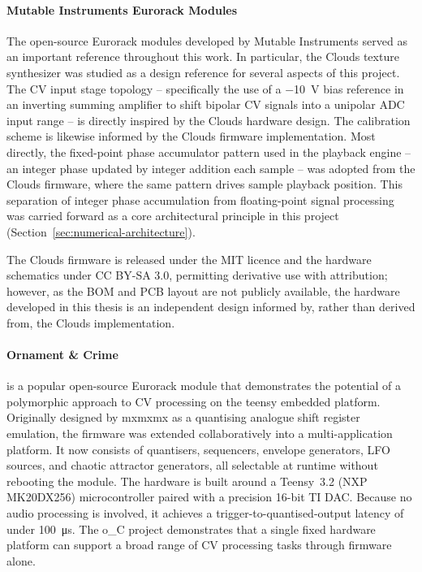 \paragraph{Mutable Instruments Eurorack Modules \cite{pichenettesPichenettesEurorack2026}}
The open-source Eurorack modules developed by Mutable Instruments served as an important reference throughout this work.
In particular, the Clouds texture synthesizer was studied as a design reference for several aspects of this project.
The CV input stage topology -- specifically the use of a \qty{-10}{\volt} bias reference in an inverting summing amplifier to shift bipolar CV signals into a unipolar ADC input range -- is directly inspired by the Clouds hardware design.
The calibration scheme is likewise informed by the Clouds firmware implementation.
Most directly, the fixed-point phase accumulator pattern used in the playback engine -- an integer phase updated by integer addition each sample -- was adopted from the Clouds firmware, where the same pattern drives sample playback position.
This separation of integer phase accumulation from floating-point signal processing was carried forward as a core architectural principle in this project (Section~\ref{sec:numerical-architecture}).

The Clouds firmware is released under the MIT licence and the hardware schematics under CC BY-SA 3.0, permitting derivative use with attribution; however, as the BOM and PCB layout are not publicly available, the hardware developed in this thesis is an independent design informed by, rather than derived from, the Clouds implementation.


\paragraph{Ornament \& Crime \cite{OrnamentCrime}}
is a popular open-source Eurorack module that demonstrates the potential of a polymorphic approach to CV processing on the teensy embedded platform.
Originally designed by mxmxmx as a quantising analogue shift register emulation, the firmware was extended collaboratively into a multi-application platform.
It now consists of quantisers, sequencers, envelope generators, LFO sources, and chaotic attractor generators, all selectable at runtime without rebooting the module.
The hardware is built around a Teensy~3.2 (NXP MK20DX256) microcontroller paired with a precision 16-bit TI DAC.
Because no audio processing is involved, it achieves a trigger-to-quantised-output latency of under \qty{100}{\micro\second}.
The o\_C project demonstrates that a single fixed hardware platform can support a broad range of CV processing tasks through firmware alone.

